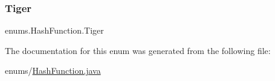 \subsubsection{\texorpdfstring{Tiger}{Tiger}}
{\footnotesize\ttfamily enums.\+Hash\+Function.\+Tiger}



The documentation for this enum was generated from the following file\+:\begin{DoxyCompactItemize}
\item 
enums/\mbox{\hyperlink{_hash_function_8java}{Hash\+Function.\+java}}\end{DoxyCompactItemize}
